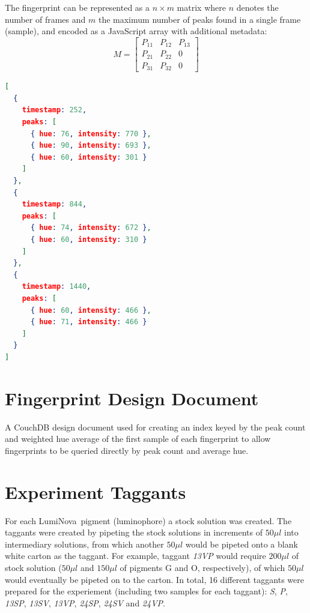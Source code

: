 \documentclass[thesis.tex]{subfiles}
\begin{document}
The fingerprint can be represented as a $n \times m$ matrix where $n$ denotes the number of frames and $m$ the maximum number of peaks found in a single frame (sample), and encoded as a JavaScript array with additional metadata:
\[
M=
  \begin{bmatrix}
    P_{11} & P_{12} & P_{13} \\
    P_{21} & P_{22} & 0 \\
    P_{31} & P_{32} & 0
  \end{bmatrix}
\]
\begin{lstlisting}[language=json,firstnumber=1]
[
  {
    timestamp: 252,
    peaks: [
      { hue: 76, intensity: 770 },
      { hue: 90, intensity: 693 },
      { hue: 60, intensity: 301 }
    ]
  },
  {
    timestamp: 844,
    peaks: [
      { hue: 74, intensity: 672 },
      { hue: 60, intensity: 310 }
    ]
  },
  {
    timestamp: 1440,
    peaks: [
      { hue: 60, intensity: 466 },
      { hue: 71, intensity: 466 }
    ]
  }
]
\end{lstlisting}


\chapter{Fingerprint Design Document}
\label{appendix:fingerprint-design-doc}
A CouchDB design document used for creating an index keyed by the peak count and weighted hue average of the first sample of each fingerprint to allow fingerprints to be queried directly by peak count and average hue.
\vspace{5mm}



\chapter{Experiment Taggants}
\label{appendix:taggants}
\enlargethispage{10\baselineskip}
For each LumiNova\textregistered\ pigment (luminophore) a stock solution was created. The taggants were created by pipeting the stock solutions in increments of $50\mu l$ into intermediary solutions, from which another $50\mu l$ would be pipeted onto a blank white carton as the taggant. For example, taggant \emph{13VP} would require $200\mu l$ of stock solution ($50\mu l$ and $150\mu l$ of pigments G and O, respectively), of which $50\mu l$ would eventually be pipeted on to the carton. In total, 16 different taggants were prepared for the experiement (including two samples for each taggant): \emph{S}, \emph{P}, \emph{13SP}, \emph{13SV}, \emph{13VP}, \emph{24SP}, \emph{24SV} and \emph{24VP}.
\end{document}
